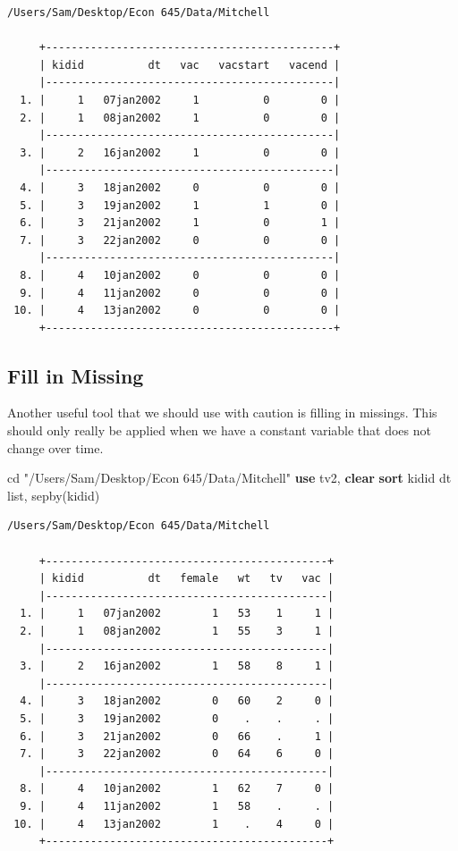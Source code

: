 \documentclass[
]{book}
\newenvironment{Shaded}{\begin{snugshade}}{\end{snugshade}}
\newcommand{\KeywordTok}[1]{\textcolor[rgb]{0.13,0.29,0.53}{\textbf{#1}}}
\newcommand{\NormalTok}[1]{#1}
\newcommand{\OtherTok}[1]{\textcolor[rgb]{0.56,0.35,0.01}{#1}}
\newcommand{\StringTok}[1]{\textcolor[rgb]{0.31,0.60,0.02}{#1}}
\begin{document}
\begin{verbatim}
/Users/Sam/Desktop/Econ 645/Data/Mitchell

     +---------------------------------------------+
     | kidid          dt   vac   vacstart   vacend |
     |---------------------------------------------|
  1. |     1   07jan2002     1          0        0 |
  2. |     1   08jan2002     1          0        0 |
     |---------------------------------------------|
  3. |     2   16jan2002     1          0        0 |
     |---------------------------------------------|
  4. |     3   18jan2002     0          0        0 |
  5. |     3   19jan2002     1          1        0 |
  6. |     3   21jan2002     1          0        1 |
  7. |     3   22jan2002     0          0        0 |
     |---------------------------------------------|
  8. |     4   10jan2002     0          0        0 |
  9. |     4   11jan2002     0          0        0 |
 10. |     4   13jan2002     0          0        0 |
     +---------------------------------------------+
\end{verbatim}

\subsection*{Fill in Missing}\label{fill-in-missing}

Another useful tool that we should use with caution is filling in missings.
This should only really be applied when we have a constant variable that
does not change over time.

\begin{Shaded}
\begin{Highlighting}[]
\NormalTok{cd }\StringTok{"/Users/Sam/Desktop/Econ 645/Data/Mitchell"}
\KeywordTok{use}\NormalTok{ tv2, }\KeywordTok{clear}
\KeywordTok{sort}\NormalTok{ kidid dt}
\OtherTok{list}\NormalTok{, sepby(kidid)}
\end{Highlighting}
\end{Shaded}

\begin{verbatim}
/Users/Sam/Desktop/Econ 645/Data/Mitchell

     +--------------------------------------------+
     | kidid          dt   female   wt   tv   vac |
     |--------------------------------------------|
  1. |     1   07jan2002        1   53    1     1 |
  2. |     1   08jan2002        1   55    3     1 |
     |--------------------------------------------|
  3. |     2   16jan2002        1   58    8     1 |
     |--------------------------------------------|
  4. |     3   18jan2002        0   60    2     0 |
  5. |     3   19jan2002        0    .    .     . |
  6. |     3   21jan2002        0   66    .     1 |
  7. |     3   22jan2002        0   64    6     0 |
     |--------------------------------------------|
  8. |     4   10jan2002        1   62    7     0 |
  9. |     4   11jan2002        1   58    .     . |
 10. |     4   13jan2002        1    .    4     0 |
     +--------------------------------------------+
\end{verbatim}
\end{document}

